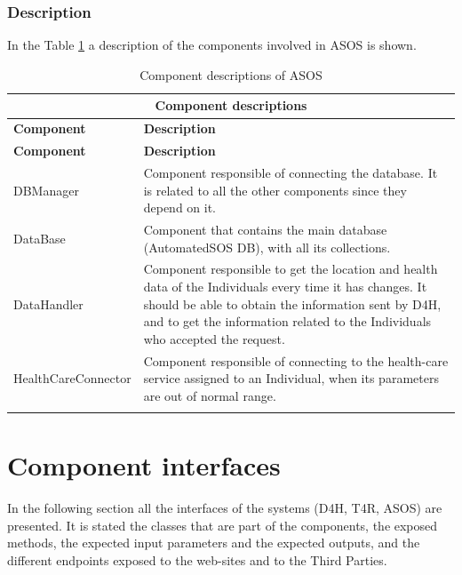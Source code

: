 \documentclass[a4paper, hidelinks, 12pt]{report}
\begin{document}
			\subsubsection{Description}
			In the Table \ref{table:asos_component_descriptions} a description of the components involved in ASOS is shown.
			
		\begin{longtable}{l p{}}
			\hline\hline
			\multicolumn{2}{c}{\textbf{Component descriptions}} \\
			\hline
			\textbf{Component} & \textbf{Description} \\ [0.5ex]
			\hline
			\endfirsthead
			\hline
			\textbf{Component} & \textbf{Description} \\ [0.5ex]
			\hline
			\endhead
			DBManager & Component responsible of connecting the database. It is related to all the other components since they depend on it.\\
			DataBase & Component that contains the main database (AutomatedSOS DB), with all its collections.\\
			DataHandler & Component responsible to get the location and health data of the Individuals every time it has changes. It should be able to obtain the information sent by D4H, and to get the information related to the Individuals who accepted the request.\\
			HealthCareConnector & Component responsible of connecting to the health-care service assigned to an Individual, when its parameters are out of normal range.\\
			\hline
			\caption{Component descriptions of ASOS}
			\label{table:asos_component_descriptions}
		\end{longtable}
		
	\section{Component interfaces}
	In the following section all the interfaces of the systems (D4H, T4R, ASOS) are presented. It is stated the classes that are part of the components, the exposed methods, the expected input parameters and the expected outputs, and the different endpoints exposed to the web-sites and to the Third Parties.
\end{document}
